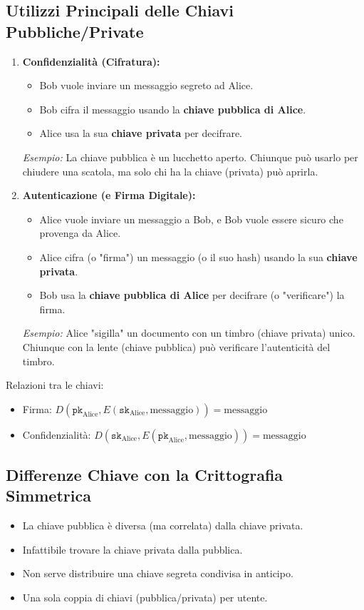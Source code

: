 \subsection{Utilizzi Principali delle Chiavi Pubbliche/Private}
\begin{enumerate}[label=\arabic*.]
    \item \textbf{Confidenzialità (Cifratura):}
    \begin{itemize}
        \item Bob vuole inviare un messaggio segreto ad Alice.
        \item Bob cifra il messaggio usando la \textbf{chiave pubblica di Alice}.
        \item Alice usa la sua \textbf{chiave privata} per decifrare.
    \end{itemize}
    \textit{Esempio:} La chiave pubblica è un lucchetto aperto. Chiunque può usarlo per chiudere una scatola, ma solo chi ha la chiave (privata) può aprirla.

    \item \textbf{Autenticazione (e Firma Digitale):}
    \begin{itemize}
        \item Alice vuole inviare un messaggio a Bob, e Bob vuole essere sicuro che provenga da Alice.
        \item Alice cifra (o "firma") un messaggio (o il suo hash) usando la sua \textbf{chiave privata}.
        \item Bob usa la \textbf{chiave pubblica di Alice} per decifrare (o "verificare") la firma.
    \end{itemize}
    \textit{Esempio:} Alice "sigilla" un documento con un timbro (chiave privata) unico. Chiunque con la lente (chiave pubblica) può verificare l'autenticità del timbro.
\end{enumerate}

Relazioni tra le chiavi:
\begin{itemize}
    \item Firma: $D(\texttt{pk}_{\text{Alice}}, E(\texttt{sk}_{\text{Alice}}, \text{messaggio})) = \text{messaggio}$
    \item Confidenzialità: $D(\texttt{sk}_{\text{Alice}}, E(\texttt{pk}_{\text{Alice}}, \text{messaggio})) = \text{messaggio}$
\end{itemize}

\subsection{Differenze Chiave con la Crittografia Simmetrica}
\begin{itemize}
    \item La chiave pubblica è diversa (ma correlata) dalla chiave privata.
    \item Infattibile trovare la chiave privata dalla pubblica.
    \item Non serve distribuire una chiave segreta condivisa in anticipo.
    \item Una sola coppia di chiavi (pubblica/privata) per utente.
\end{itemize}

